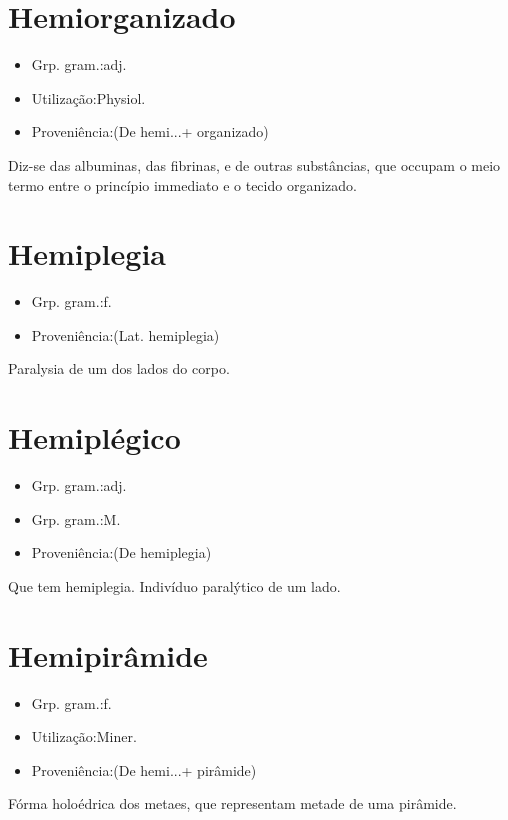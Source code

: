 \documentclass{article}
\begin{document}
\section{Hemiorganizado}
\begin{itemize}
\item {Grp. gram.:adj.}
\end{itemize}
\begin{itemize}
\item {Utilização:Physiol.}
\end{itemize}
\begin{itemize}
\item {Proveniência:(De \textunderscore hemi...\textunderscore  + \textunderscore organizado\textunderscore )}
\end{itemize}
Diz-se das albuminas, das fibrinas, e de outras substâncias, que occupam o meio termo entre o princípio immediato e o tecido organizado.
\section{Hemiplegia}
\begin{itemize}
\item {Grp. gram.:f.}
\end{itemize}
\begin{itemize}
\item {Proveniência:(Lat. \textunderscore hemiplegia\textunderscore )}
\end{itemize}
Paralysia de um dos lados do corpo.
\section{Hemiplégico}
\begin{itemize}
\item {Grp. gram.:adj.}
\end{itemize}
\begin{itemize}
\item {Grp. gram.:M.}
\end{itemize}
\begin{itemize}
\item {Proveniência:(De \textunderscore hemiplegia\textunderscore )}
\end{itemize}
Que tem hemiplegia.
Indivíduo paralýtico de um lado.
\section{Hemipirâmide}
\begin{itemize}
\item {Grp. gram.:f.}
\end{itemize}
\begin{itemize}
\item {Utilização:Miner.}
\end{itemize}
\begin{itemize}
\item {Proveniência:(De \textunderscore hemi...\textunderscore  + \textunderscore pirâmide\textunderscore )}
\end{itemize}
Fórma holoédrica dos metaes, que representam metade de uma pirâmide.
\end{document}
